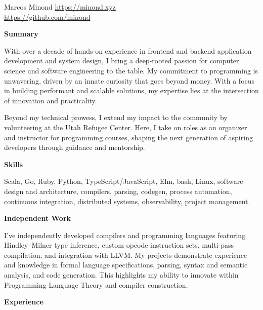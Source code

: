 \documentclass[10pt]{article}
\newcommand{\SectionTitle}[2][.2in] {
  \vspace{#1}
  \textbf{\large #2}
  \vspace{.1in}
}
\begin{document}
\begin{flushleft}

\huge{Marcos Minond} \normalsize
\hfill \href{https://minond.xyz}{https://minond.xyz} \\
\hfill \href{https://github.com/minond}{https://github.com/minond}

\normalsize


\SectionTitle[.1in]{Summary}

With over a decade of hands-on experience in frontend and backend application
development and system design, I bring a deep-rooted passion for computer
science and software engineering to the table. My commitment to programming
is unwavering, driven by an innate curiosity that goes beyond money. With a
focus in building performant and scalable solutions, my expertise lies at the
intersection of innovation and practicality.

\vspace{.08in}

Beyond my technical prowess, I extend my impact to the community by
volunteering at the Utah Refugee Center. Here, I take on roles as an
organizer and instructor for programming courses, shaping the next generation
of aspiring developers through guidance and mentorship.

\SectionTitle{Skills}

Scala, Go, Ruby, Python, TypeScript/JavaScript, Elm, bash, Linux, software
design and architecture, compilers, parsing, codegen, process automation,
continuous integration, distributed systems, observability, project management.

\SectionTitle{Independent Work}

I've independently developed compilers and programming languages featuring
Hindley–Milner type inference, custom opcode instruction sets, multi-pass
compilation, and integration with LLVM. My projects demonstrate experience
and knowledge in formal language specifications, parsing, syntax and semantic
analysis, and code generation. This highlights my ability to innovate within
Programming Language Theory and compiler construction.

\SectionTitle{Experience}


\end{flushleft}
\end{document}
